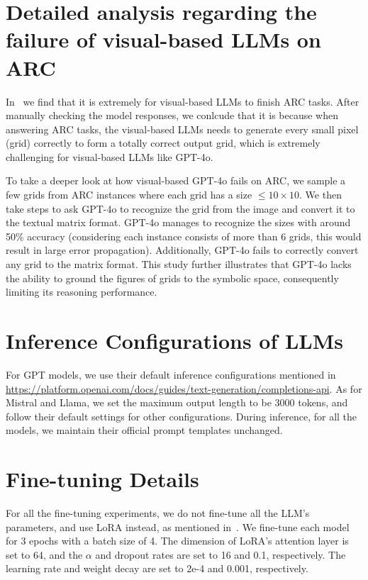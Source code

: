 \section{Detailed analysis regarding the failure of visual-based LLMs on ARC}
\label{appendix:visual analysis}
In~ we find that it is extremely for visual-based LLMs to finish ARC tasks. After manually checking the model responses, we conlcude that it is because when answering ARC tasks, the visual-based LLMs needs to generate every small pixel (grid) correctly to form a totally correct output grid, which is extremely challenging for visual-based LLMs like GPT-4o. 

To take a deeper look at how visual-based GPT-4o fails on ARC, we sample a few grids from ARC instances where each grid has a size $\leq 10\times10$. We then take steps to ask GPT-4o to recognize the grid from the image and convert it to the textual matrix format. GPT-4o manages to recognize the sizes with around 50\% accuracy (considering each instance consists of more than 6 grids, this would result in large error propagation). Additionally, GPT-4o fails to correctly convert any grid to the matrix format. This study further illustrates that GPT-4o lacks the ability to ground the figures of grids to the symbolic space, consequently limiting its reasoning performance.

\section{Inference Configurations of LLMs}
\label{appendix:inference config}
For GPT models, we use their default inference configurations mentioned in \url{https://platform.openai.com/docs/guides/text-generation/completions-api}. As for Mistral and Llama, we set the maximum output length to be 3000 tokens, and follow their default settings for other configurations. During inference, for all the models, we maintain their official prompt templates unchanged.

\section{Fine-tuning Details}
\label{appendix:lora}
For all the fine-tuning experiments, we do not fine-tune all the LLM's parameters, and use LoRA instead, as mentioned in~. We fine-tune each model for 3 epochs with a batch size of 4. The dimension of LoRA's attention layer is set to 64, and the $\alpha$ and dropout rates are set to 16 and 0.1, respectively. The learning rate and weight decay are set to 2e-4 and 0.001, respectively.

